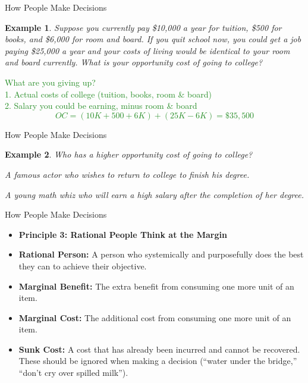 \documentclass[xcolor={dvipsnames},pdf, hyperref={colorlinks=true, citecolor=ForestGreen, linkcolor=BlueViolet, urlcolor=Magenta}]{beamer}
\newtheorem{exmp}{Example}[section]
\newcommand{\defn}[1]{\textbf{#1}}
\newcommand{\ddp}[1]{{\textcolor{ForestGreen}{#1}}}
\begin{document}
\begin{frame}{How People Make Decisions}
	\begin{exmp} 
		Suppose you currently pay \$10,000 a year for tuition, \$500 for books, and \$6,000 for room and board. If you quit school now, you could get a job paying \$25,000 a year and your costs of living would be identical to your room and board currently. What is your opportunity cost of going to college?
	\end{exmp}
		\ddp{\pause What are you giving up? \\
			1. Actual costs of college (tuition, books, room \& board) \\
			2. Salary you could be earning, minus room \& board
		\[OC = (10K + 500 + 6K) + (25K - 6K) = \$35,500\]}
\end{frame}

\begin{frame}{How People Make Decisions}
	\begin{exmp} 
		Who has a higher opportunity cost of going to college?
		\begin{enumerate}[(a)]
			{\setlength\itemindent{25pt}\item A famous actor who wishes to return to college to finish his degree.}
			{\setlength\itemindent{25pt}\item A young math whiz who will earn a high salary after the completion of her degree.}
		\end{enumerate}
	\end{exmp}
		\pause \ddp{The famous actor is giving up a high salary to return to school, while the math whiz is only giving up the wages she would earn without her degree which are much lower.}
\end{frame}

\begin{frame}{How People Make Decisions}
	\begin{itemize}
		\item \textbf{Principle 3: Rational People Think at the Margin}
		\item \defn{Rational Person:} A person who systemically and purposefully does the best they can to achieve their objective.
		
		\item \defn{Marginal Benefit:} The extra benefit from consuming one more unit of an item.
		
		\item \defn{Marginal Cost:} The additional cost from consuming one more unit of an item.
		
		\item \defn{Sunk Cost:} A cost that has already been incurred and cannot be recovered. These should be ignored when making a decision (``water under the bridge,'' ``don't cry over spilled milk'').
	\end{itemize}
\end{frame}
\end{document}
